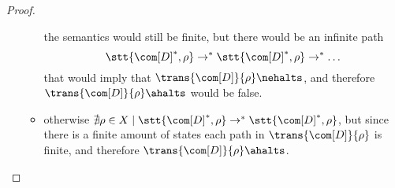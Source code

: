 \begin{proof}
\begin{itemize}
\begin{itemize}
      \stt{\com[D]^*, \rho}\) the semantics would still be finite, but
      there would be an infinite path \[\stt{\com[D]^*, \rho} \to^*
      \stt{\com[D]^*, \rho} \to^* \dots\] that would imply that
      \(\trans{\com[D]}{\rho} \nehalts\), and therefore
      \(\trans{\com[D]}{\rho} \ahalts\) would be false.
    \item otherwise \(\nexists \rho \in X \mid \stt{\com[D]^*, \rho}
      \to^* \stt{\com[D]^*, \rho}\), but since there is a finite
      amount of states each path in \(\trans{\com[D]}{\rho}\) is
      finite, and therefore \(\trans{\com[D]}{\rho}\ahalts\).
    \end{itemize}
  \end{itemize}
\end{proof}

